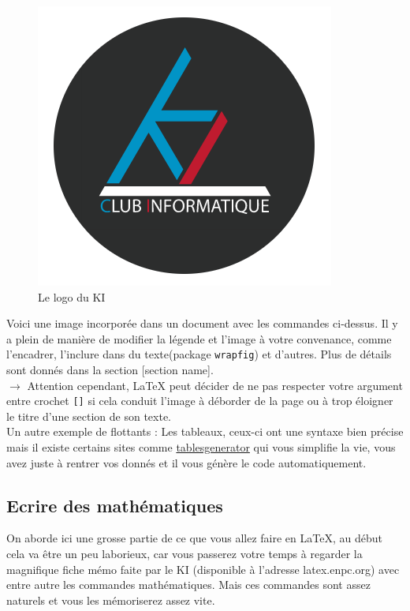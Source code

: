 \documentclass[11pt]{article}				%
\begin{document}
\begin{figure}[h!]
	\centering
	\includegraphics[scale=0.2]{ressources/KI.png}
	\caption{Le logo du KI}
\end{figure}



Voici une image incorporée dans un document avec les commandes ci-dessus. Il y a plein de manière de modifier la légende et l'image à votre convenance, comme l'encadrer, l'inclure dans du texte(package \texttt{wrapfig}) et d'autres. Plus de détails sont donnés dans la section [section name].\\


$\rightarrow$ Attention cependant, LaTeX peut décider de ne pas respecter votre argument entre crochet \texttt{[]} si cela conduit l'image à déborder de la page ou à trop éloigner le titre d'une section de son texte.\\

Un autre exemple de flottants : Les tableaux, ceux-ci ont une syntaxe bien précise mais il existe certains sites comme \href{https://www.tablesgenerator.com/}{tablesgenerator} qui vous simplifie la vie, vous avez juste à rentrer vos donnés et il vous génère le code automatiquement.


\subsection{Ecrire des mathématiques}

On aborde ici une grosse partie de ce que vous allez faire en LaTeX, au début cela va être un peu laborieux, car vous passerez votre temps à regarder la magnifique fiche mémo faite par le KI (disponible à l'adresse latex.enpc.org) avec entre autre les commandes mathématiques. Mais ces commandes sont assez naturels et vous les mémoriserez assez vite.\\
\end{document}

